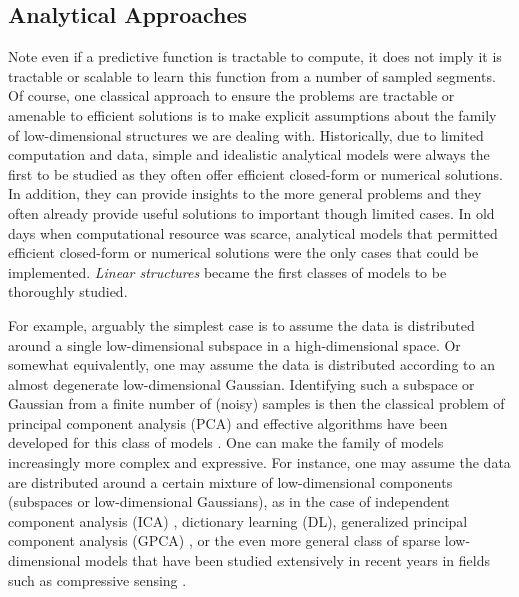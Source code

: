 \documentclass[../../book-main.tex]{subfiles}
\begin{document}
\subsection{Analytical Approaches}
\label{sec:analytical}
Note even if a predictive function is tractable to compute, it does not imply it is tractable or scalable to learn this function from a number of sampled segments. Of course, one classical approach to ensure the problems are tractable or amenable to efficient solutions is to make explicit assumptions about the family of low-dimensional structures we are dealing with. Historically, due to limited computation and data, simple and idealistic analytical models were always the first to be studied as they often offer efficient closed-form or numerical solutions. In addition, they can provide insights to the more general problems and they often already provide useful solutions to important though limited cases. In old days when computational resource was scarce, analytical models that permitted efficient closed-form or numerical solutions were the only cases that could be implemented. {\em Linear structures} became the first classes of models to be thoroughly studied.

For example, arguably the simplest case is to assume the data is distributed around a single low-dimensional subspace in a high-dimensional space. Or somewhat equivalently, one may assume the data is distributed according to an almost degenerate low-dimensional Gaussian. Identifying such a subspace or Gaussian from a finite number of (noisy) samples is then the classical problem of principal component analysis (PCA) and  effective algorithms have been developed for this class of models \cite{JolliffeI2002}. One can make the family of models increasingly more complex and expressive. For instance, one may assume the data are distributed around a certain mixture of low-dimensional components (subspaces or low-dimensional Gaussians), as in the case of independent component analysis (ICA) \cite{Ans-1985}, dictionary learning (DL), generalized principal component analysis (GPCA) \cite{Vidal-GPCA}, or the even more general class of sparse low-dimensional models that have been studied extensively in recent years in fields such as compressive sensing \cite{Wright-Ma-2022}. 
\end{document}
